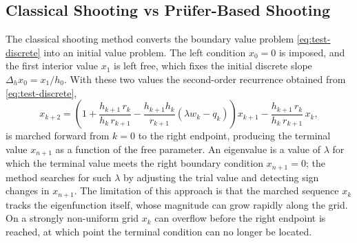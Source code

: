 \documentclass[12pt,reqno]{amsart}
\numberwithin{equation}{section}
\begin{document}
\subsection{Classical Shooting vs Pr\"ufer-Based Shooting}

The classical shooting method converts the boundary value problem \eqref{eq:test-discrete} into an initial value problem. The left condition $x_0 = 0$ is imposed, and the first interior value $x_1$ is left free, which fixes the initial discrete slope $\Delta_h x_0 = x_1 / h_0$. With these two values the second-order recurrence obtained from \eqref{eq:test-discrete},
\begin{equation}
\label{eq:classical-recurrence}
x_{k+2} = \left(1 + \frac{h_{k+1}\, r_k}{h_k\, r_{k+1}} - \frac{h_{k+1} h_k}{r_{k+1}}\left(\lambda w_k - q_k\right)\right) x_{k+1} - \frac{h_{k+1}\, r_k}{h_k\, r_{k+1}}\, x_k,
\end{equation}
is marched forward from $k = 0$ to the right endpoint, producing the terminal value $x_{n+1}$ as a function of the free parameter. An eigenvalue is a value of $\lambda$ for which the terminal value meets the right boundary condition $x_{n+1} = 0$; the method searches for such $\lambda$ by adjusting the trial value and detecting sign changes in $x_{n+1}$. The limitation of this approach is that the marched sequence $x_k$ tracks the eigenfunction itself, whose magnitude can grow rapidly along the grid. On a strongly non-uniform grid $x_k$ can overflow before the right endpoint is reached, at which point the terminal condition can no longer be located.

\medskip 
\end{document}
